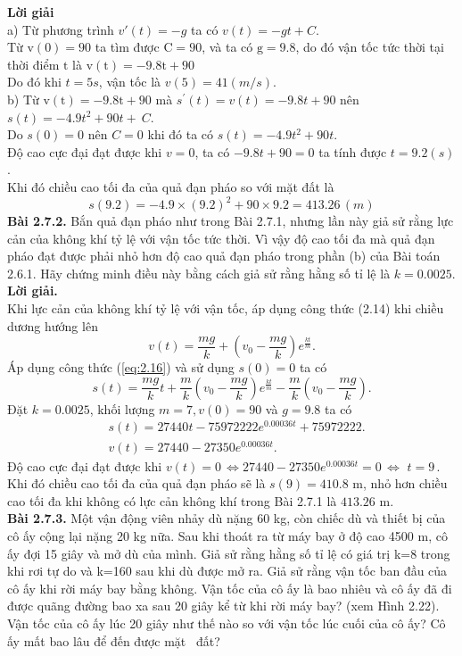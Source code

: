 \noindent\textbf{Lời giải}\\
a)  Từ phương trình $v'(t)=-g$ ta có $v(t)=-gt+C$.\\
Từ $\mathrm{v}(0)=90$ ta tìm được $\mathrm{C}=90$, và ta có $\mathrm{g}=9.8$, do đó vận tốc tức thời tại thời điểm $\mathrm{t}$ là $\mathrm{v}(\mathrm{t})=-9.8 \mathrm{t}+90$\\
Do đó khi $t=5s$, vận tốc là $v(5)=41 (m/s)$.\\
 b) Từ $\mathrm{v}(\mathrm{t})=-9.8 \mathrm{t}+90$ mà $s^{\prime}(t)=v(t)=-9.8 t+90 $ nên $ s(t)=-4.9 t^2+90 t+~C$.\\
Do $s(0)=0$ nên $C=0$ khi đó ta có $s(t)=-4.9{{t}^{2}}+90t.$\\
Độ cao cực đại đạt được khi $v=0$, ta có $-9.8t+90=0$ ta tính được $t=9.2 (s)$.\\
Khi đó chiều cao tối đa của quả đạn pháo so với mặt đất là    
$$s(9.2)=-4.9\times {{(9.2)}^{2}}+90\times 9.2=413.26\,(m)$$
\textbf{Bài 2.7.2.}  Bắn quả đạn pháo như trong Bài 2.7.1, nhưng lần này giả sử rằng lực cản của không khí tỷ lệ với vận tốc tức thời. Vì vậy độ cao tối đa mà quả đạn pháo đạt được phải nhỏ hơn độ cao quả đạn pháo trong phần (b) của Bài toán 2.6.1. Hãy chứng minh điều này bằng cách giả sử rằng hằng số tỉ lệ là $k=0.0025. $\\
\textbf{Lời giải.}\\
Khi lực cản của không khí tỷ lệ với vận tốc, áp dụng công thức (2.14) khi chiều dương hướng lên $$v(t)=\dfrac{mg}{k}+({{v}_{0}}-\dfrac{mg}{k}){{e}^{\frac{kt}{m}}}.$$
Áp dụng công thức (\ref{eq:2.16}) và sử dụng $s(0) = 0$ ta có
$$s(t)=\dfrac{mg}{k}t+\dfrac{m}{k}({{v}_{0}}-\dfrac{mg}{k}){{e}^{\frac{kt}{m}}}-\dfrac{m}{k}({{v}_{0}}-\dfrac{mg}{k}).$$
Đặt $k = 0.0025$, khối lượng $m =7, v(0) = 90 $ và $g = 9.8$  ta có
$$
\begin{array}{ll}
&s(t)=27440t-75972222{{e}^{0.00036t}}+75972222.\\
&v(t)=27440-27350{{e}^{0.00036t}}.
\end{array}
$$
Độ cao cực đại đạt được khi $v(t)=0\,\Leftrightarrow 27440-27350{{e}^{0.00036t}}=0\,\Leftrightarrow \,\,t=9\,$.\\ 
Khi đó chiều cao tối đa của quả đạn pháo sẽ là $s(9) = 410.8$ m, nhỏ hơn chiều cao tối đa khi không có lực cản không khí trong Bài 2.7.1 là $413.26$ m.\\
\textbf{Bài 2.7.3. } Một vận động viên nhảy dù nặng $60$ kg, còn chiếc dù và thiết bị của cô ấy cộng lại nặng 20 kg nữa. Sau khi thoát ra từ máy bay ở độ cao 4500 m, cô ấy đợi 15 giây và mở dù của mình. Giả sử rằng hằng số tỉ lệ có giá trị k=8 trong khi rơi tự do và k=160 sau khi dù được mở ra. Giả sử rằng vận tốc ban đầu của cô ấy khi rời máy bay bằng không. Vận tốc của cô ấy là bao nhiêu và cô ấy đã đi được quãng đường bao xa sau 20 giây kể từ khi rời máy bay? (xem Hình 2.22). Vận tốc của cô ấy lúc 20 giây như thế nào so với vận tốc lúc cuối của cô ấy? Cô ấy mất bao lâu để đến được mặt~ đất? 
